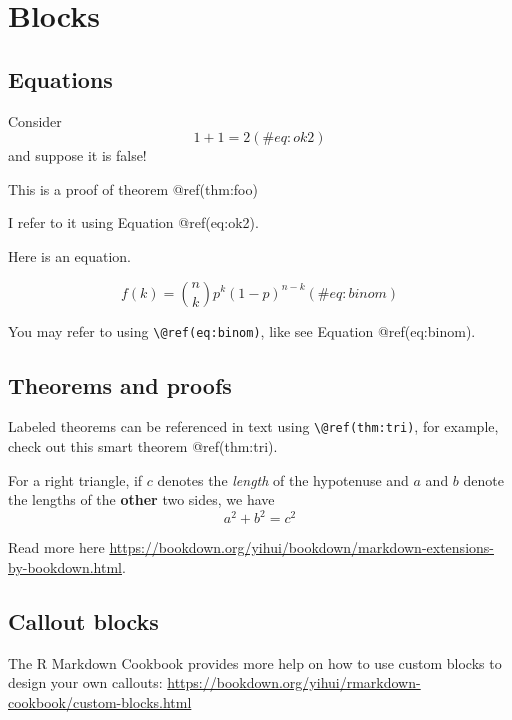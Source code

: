 \documentclass[
]{article}
\author{}
\date{\vspace{-2.5em}}
\begin{document}
\hypertarget{blocks}{%
\section{Blocks}\label{blocks}}

\hypertarget{equations}{%
\subsection{Equations}\label{equations}}

\leavevmode{}%
Consider \[
    1+1=2               (\#eq:ok2)
\] and suppose it is false!

This is a proof of theorem @ref(thm:foo)

I refer to it using Equation @ref(eq:ok2).

Here is an equation.

\begin{equation} 
  f\left(k\right) = \binom{n}{k} p^k\left(1-p\right)^{n-k}
  (\#eq:binom)
\end{equation}

You may refer to using \texttt{\textbackslash{}@ref(eq:binom)}, like see
Equation @ref(eq:binom).

\hypertarget{theorems-and-proofs}{%
\subsection{Theorems and proofs}\label{theorems-and-proofs}}

Labeled theorems can be referenced in text using
\texttt{\textbackslash{}@ref(thm:tri)}, for example, check out this
smart theorem @ref(thm:tri).

\leavevmode{}%
For a right triangle, if \(c\) denotes the \emph{length} of the
hypotenuse and \(a\) and \(b\) denote the lengths of the \textbf{other}
two sides, we have \[a^2 + b^2 = c^2\]

Read more here
\url{https://bookdown.org/yihui/bookdown/markdown-extensions-by-bookdown.html}.

\hypertarget{callout-blocks}{%
\subsection{Callout blocks}\label{callout-blocks}}

The R Markdown Cookbook provides more help on how to use custom blocks
to design your own callouts:
\url{https://bookdown.org/yihui/rmarkdown-cookbook/custom-blocks.html}
\end{document}
